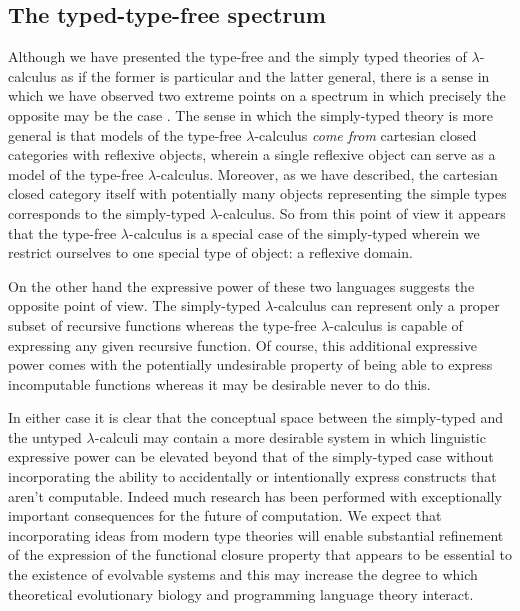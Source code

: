 \subsection*{The typed-type-free spectrum}
Although we have presented the type-free and the simply typed theories of $\lambda$-calculus as if the former is particular and the latter general, there is a sense in which we have observed two extreme points on a spectrum in which precisely the opposite may be the case \cite{Scott1980,Barendregt1985}. The sense in which the simply-typed theory is more general is that models of the type-free $\lambda$-calculus \emph{come from} cartesian closed categories with reflexive objects, wherein a single reflexive object can serve as a model of the type-free $\lambda$-calculus. Moreover, as we have described, the cartesian closed category itself with potentially many objects representing the simple types corresponds to the simply-typed $\lambda$-calculus. So from this point of view it appears that the type-free $\lambda$-calculus is a special case of the simply-typed wherein we restrict ourselves to one special type of object: a reflexive domain.

On the other hand the expressive power of these two languages suggests the opposite point of view. The simply-typed $\lambda$-calculus can represent only a proper subset of recursive functions whereas the type-free $\lambda$-calculus is capable of expressing any given recursive function. Of course, this additional expressive power comes with the potentially undesirable property of being able to express incomputable functions whereas it may be desirable never to do this.

In either case it is clear that the conceptual space between the simply-typed and the untyped $\lambda$-calculi may contain a more desirable system in which linguistic expressive power can be elevated beyond that of the simply-typed case without incorporating the ability to accidentally or intentionally express constructs that aren't computable. Indeed much research has been performed with exceptionally important consequences for the future of computation. We expect that incorporating ideas from modern type theories will enable substantial refinement of the expression of the functional closure property that appears to be essential to the existence of evolvable systems and this may increase the degree to which theoretical evolutionary biology and programming language theory interact.
